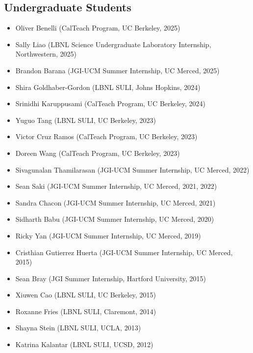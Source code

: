 \documentclass[11pt,letterpaper]{article}
\newenvironment{cvlist}
  {\begin{itemize}[leftmargin=1.4em, label=\textcolor{accent2}{\small$\bullet$},
    itemsep=2.5pt, topsep=2pt, parsep=0pt]}
  {\end{itemize}}
\begin{document}
\subsection{Undergraduate Students}
\begin{cvlist}
  \item Oliver Benelli (CalTeach Program, UC Berkeley, 2025)
  \item Sally Liao (LBNL Science Undergraduate Laboratory Internship, Northwestern, 2025)
  \item Brandon Barana (JGI-UCM Summer Internship, UC Merced, 2025)
  \item Shira Goldhaber-Gordon (LBNL SULI, Johns Hopkins, 2024)
  \item Srinidhi Karuppusami (CalTeach Program, UC Berkeley, 2024)
  \item Yuguo Tang (LBNL SULI, UC Berkeley, 2023)
  \item Victor Cruz Ramos (CalTeach Program, UC Berkeley, 2023)
  \item Doreen Wang (CalTeach Program, UC Berkeley, 2023)
  \item Sivagunalan Thamilarasan (JGI-UCM Summer Internship, UC Merced, 2022)
  \item Sean Saki (JGI-UCM Summer Internship, UC Merced, 2021, 2022)
  \item Sandra Chacon (JGI-UCM Summer Internship, UC Merced, 2021)
  \item Sidharth Babu (JGI-UCM Summer Internship, UC Merced, 2020)
  \item Ricky Yan (JGI-UCM Summer Internship, UC Merced, 2019)
  \item Cristhian Gutierrez Huerta (JGI-UCM Summer Internship, UC Merced, 2015)
  \item Sean Bray (JGI Summer Internship, Hartford University, 2015)
  \item Xiuwen Cao (LBNL SULI, UC Berkeley, 2015)
  \item Roxanne Fries (LBNL SULI, Claremont, 2014)
  \item Shayna Stein (LBNL SULI, UCLA, 2013)
  \item Katrina Kalantar (LBNL SULI, UCSD, 2012)
\end{cvlist}
\end{document}
